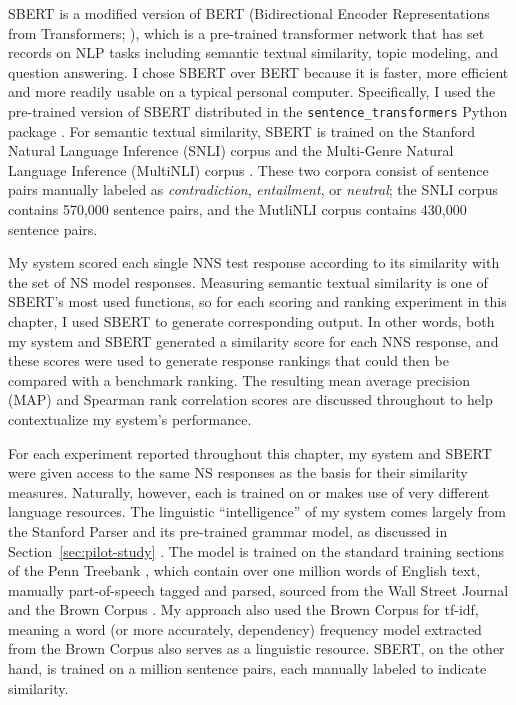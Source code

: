 SBERT is a modified version of BERT (Bidirectional Encoder Representations from Transformers; \citealp[][]{BertDevlin2018}), which is a pre-trained transformer network that has set records on NLP tasks including semantic textual similarity, topic modeling, and question answering. I chose SBERT over BERT because it is faster, more efficient and more readily usable on a typical personal computer. Specifically, I used the pre-trained version of SBERT distributed in the \texttt{sentence\_transformers} Python package \cite{sbert-python}. For semantic textual similarity, SBERT is trained on the Stanford Natural Language Inference (SNLI) corpus \cite{bowman2015} and the Multi-Genre Natural Language Inference (MultiNLI) corpus \cite{MultiNLI2018}. These two corpora consist of sentence pairs manually labeled as \textit{contradiction}, \textit{entailment}, or \textit{neutral}; the SNLI corpus contains 570,000 sentence pairs, and the MutliNLI corpus contains 430,000 sentence pairs.
 
My system scored each single NNS test response according to its similarity with the set of NS model responses. Measuring semantic textual similarity is one of SBERT's most used functions, so for each scoring and ranking experiment in this chapter, I used SBERT to generate corresponding output. In other words, both my system and SBERT generated a similarity score for each NNS response, and these scores were used to generate response rankings that could then be compared with a benchmark ranking. The resulting mean average precision (MAP) and Spearman rank correlation scores are discussed throughout to help contextualize my system's performance.

For each experiment reported throughout this chapter, my system and SBERT were given access to the same NS responses as the basis for their similarity measures. Naturally, however, each is trained on or makes use of very different language resources. The linguistic ``intelligence'' of my system comes largely from the Stanford Parser and its pre-trained grammar model, as discussed in Section~\ref{sec:pilot-study} \cite{klein:manning:03}. The model is trained on the standard training sections of the Penn Treebank \cite{marcus-et-al:93}, which contain over one million words of English text, manually part-of-speech tagged and parsed, sourced from the Wall Street Journal and the Brown Corpus  \cite{kucera:francis:67}. My approach also used the Brown Corpus for tf-idf, meaning a word (or more accurately, dependency) frequency model extracted from the Brown Corpus also serves as a linguistic resource. SBERT, on the other hand, is trained on a million sentence pairs, each manually labeled to indicate similarity.

